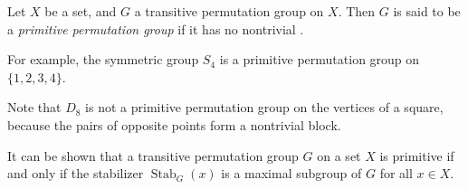 \documentclass[12pt]{article}
\DeclareMathOperator{\Stab}{Stab}
\begin{document}

Let $X$ be a set, and $G$ a transitive permutation group on $X$.
Then $G$ is said to be a \emph{primitive permutation group} if it has no nontrivial .

For example, the symmetric group $S_4$ is a primitive permutation group on $\{1,2,3,4\}$.

Note that $D_8$ is not a primitive permutation group on the vertices of a square, because the pairs of opposite points form a nontrivial block.

It can be shown that a transitive permutation group $G$ on a set $X$ is primitive if and only if the stabilizer $\Stab_G(x)$ is a maximal subgroup of $G$ for all $x\in X$.
\end{document}
